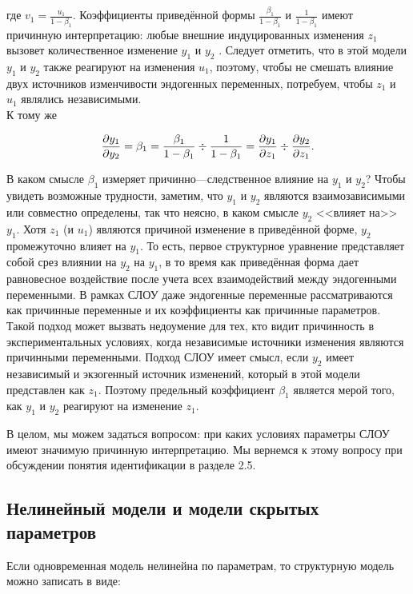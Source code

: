 где $v_{1}=\frac{u_{1}}{1-\beta_{1}}$. Коэффициенты приведённой формы $\frac{\beta_{1}}{1-\beta_{1}}$ и $\frac{1}{1-\beta_{1}}$  имеют причинную интерпретацию: любые внешние индуцированных изменения $z_{1}$ вызовет количественное изменение $y_{1}$ и $y_{2}$ . Следует отметить, что в этой модели $y_{1}$ и $y_{2}$ также реагируют на изменения $u_{1}$, поэтому, чтобы не смешать влияние двух источников изменчивости эндогенных переменных, потребуем, чтобы $z_{1}$ и $u_{1}$ являлись независимыми. \\
	К тому же

\[
\frac{\partial y_{1}}{\partial y_{2}}=\beta_{1}=\frac{\beta_{1}}{1-\beta_{1}}\div\frac{1}{1-\beta_{1}} \\
=\frac{\partial y_{1}}{\partial z_{1}}\div\frac{\partial y_{2}}{\partial z_{1}}.
\]


В каком смысле $\beta_{1}$ измеряет причинно---следственное влияние на $y_{1}$ и $y_{2}$? Чтобы увидеть возможные трудности, заметим, что $y_{1}$ и $y_{2}$ являются взаимозависимыми или совместно определены, так что неясно, в каком смысле $y_{2}$ <<влияет на>> $y_{1}$. Хотя $z_{1}$ (и $u_{1}$) являются причиной изменение в приведённой форме, $y_{2}$ промежуточно влияет на $y_{1}$. То есть, первое структурное уравнение представляет собой срез влиянии на $y_{2}$ на  $y_{1}$, в то время как приведённая форма дает равновесное воздействие после учета всех взаимодействий  между эндогенными переменными. В рамках СЛОУ даже эндогенные переменные рассматриваются как причинные переменные и их коэффициенты как причинные параметров. Такой подход может вызвать недоумение для тех, кто видит причинность в экспериментальных условиях, когда независимые источники изменения являются причинными переменными. Подход СЛОУ имеет смысл, если $y_{2}$ имеет независимый и экзогенный источник изменений, который в этой модели представлен как $z_{1}$. Поэтому предельный коэффициент $\beta_{1}$ является мерой того, как $y_{1}$ и $y_{2}$ реагируют на изменение $z_{1}$. 


	В целом, мы можем задаться вопросом: при каких условиях параметры СЛОУ имеют значимую причинную интерпретацию. Мы вернемся к этому вопросу при обсуждении понятия идентификации в разделе 2.5.


\subsection{Нелинейный модели и модели скрытых параметров}


Если одновременная модель нелинейна по параметрам, то структурную модель можно записать в виде:



